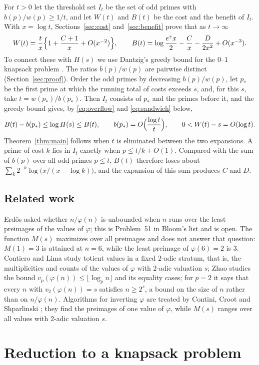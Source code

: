\documentclass[11pt]{amsart}
\theoremstyle{remark}
\numberwithin{equation}{section}
\begin{document}
For $t>0$ let the threshold set $I_t$ be the set of odd primes with
$b(p)/w(p)\ge1/t$, and let $W(t)$ and $B(t)$ be the cost and the benefit
of $I_t$. With $x=\log t$, Sections~\ref{sec:cost}
and~\ref{sec:benefit} prove that as $t\to\infty$
\[
W(t)=\frac tx\Bigl\{1+\frac{C+1}{x}+O(x^{-2})\Bigr\},\qquad
B(t)=\log\frac{e^\gamma x}{2}-\frac Cx-\frac D{2x^2}+O(x^{-3}).
\]
To connect these with $H(s)$ we use Dantzig's greedy bound for the
$0$--$1$ knapsack problem \cite{Da57}. The ratios $b(p)/w(p)$ are
pairwise distinct (Section~\ref{sec:proof}). Order the odd primes by
decreasing $b(p)/w(p)$, let $p_*$ be the first prime at which the running
total of costs exceeds $s$, and, for this $s$, take
$t=w(p_*)/b(p_*)$. Then $I_t$ consists of $p_*$ and the primes before it,
and the greedy bound gives, by \eqref{eq:overflow} and
\eqref{eq:sandwich} below,
\[
B(t)-b(p_*)\le\log H(s)\le B(t),\qquad b(p_*)=O\Bigl(\frac{\log t}{t}\Bigr),\qquad 0<W(t)-s=O(\log t).
\]
Theorem~\ref{thm:main} follows when $t$ is eliminated between the two
expansions. A prime of cost $k$ lies in $I_t$ exactly when
$p\le t/k+O(1)$. Compared with the sum of $b(p)$ over all odd primes
$p\le t$, $B(t)$ therefore
loses about $\sum_k2^{-k}\log\bigl(x/(x-\log k)\bigr)$, and the expansion
of this sum produces $C$ and $D$.

\subsection*{Related work}
Erd\H{o}s asked whether $n/\varphi(n)$ is unbounded when $n$ runs over
the least preimages of the values of $\varphi$; this is Problem~51 in
Bloom's list \cite{Bloom51} and is open. The function $M(s)$ maximizes
over all preimages and does not answer that question: $M(1)=3$ is
attained at $n=6$, while the least preimage of $\varphi(6)=2$ is $3$.
Contiero and Lima \cite{CL20} study totient values in a fixed $2$-adic
stratum, that is, the multiplicities and counts of the values of
$\varphi$ with $2$-adic valuation $s$; Zhao \cite{Zh25} studies the bound
$v_p(\varphi(n))\le\lfloor\log_p n\rfloor$ and its equality cases; for
$p=2$ it says that every $n$ with $v_2(\varphi(n))=s$ satisfies $n\ge2^s$,
a bound on the size of $n$ rather than on $n/\varphi(n)$.
Algorithms for inverting $\varphi$ are treated by Contini, Croot and
Shparlinski \cite{CCS06}; they find the preimages of one value of
$\varphi$, while $M(s)$ ranges over all values with $2$-adic valuation $s$.

\section{Reduction to a knapsack problem}\label{sec:reduction}
\end{document}
